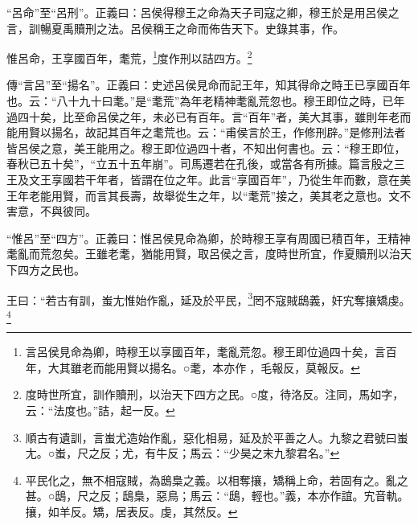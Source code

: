 {\noindent\shu{}\fzkt “呂命”至“呂刑”。正義曰：呂侯得穆王之命為天子司寇之卿，穆王於是用呂侯之言，訓暢夏禹贖刑之法。呂侯稱王之命而佈告天下。史錄其事，作。 \par}

惟呂命，王享國百年，耄荒，\footnote{言呂侯見命為卿，時穆王以享國百年，耄亂荒忽。穆王即位過四十矣，言百年，大其雖老而能用賢以揚名。○耄，本亦作𦿗，毛報反，莫報反。}度作刑以詰四方。\footnote{度時世所宜，訓作贖刑，以治天下四方之民。○度，待洛反。注同，馬如字，云：“法度也。”詰，起一反。}


{\noindent\zhuan{}\fzbyks 傳“言呂”至“揚名”。正義曰：史述呂侯見命而記王年，知其得命之時王已享國百年也。云：“八十九十曰耄。”是“耄荒”為年老精神耄亂荒忽也。穆王即位之時，已年過四十矣，比至命呂侯之年，未必已有百年。言“百年”者，美大其事，雖則年老而能用賢以揚名，故記其百年之耄荒也。云：“甫侯言於王，作修刑辟。”是修刑法者皆呂侯之意，美王能用之。穆王即位過四十者，不知出何書也。云：“穆王即位，春秋已五十矣”，“立五十五年崩”。司馬遷若在孔後，或當各有所據。篇言殷之三王及文王享國若干年者，皆謂在位之年。此言“享國百年”，乃從生年而數，意在美王年老能用賢，而言其長壽，故舉從生之年，以“耄荒”接之，美其老之意也。文不害意，不與彼同。 \par}

{\noindent\shu{}\fzkt “惟呂”至“四方”。正義曰：惟呂侯見命為卿，於時穆王享有周國已積百年，王精神耄亂而荒忽矣。王雖老耄，猶能用賢，取呂侯之言，度時世所宜，作夏贖刑以治天下四方之民也。 \par}

王曰：“若古有訓，蚩尢惟始作亂，延及於平民，\footnote{順古有遺訓，言蚩尤造始作亂，惡化相易，延及於平善之人。九黎之君號曰蚩尢。○蚩，尺之反；尤，有牛反；馬云：“少昊之末九黎君名。”}罔不寇賊鴟義，奸宄奪攘矯虔。\footnote{平民化之，無不相寇賊，為鴟梟之義。以相奪攘，矯稱上命，若固有之。亂之甚。○鴟，尺之反；鴟梟，惡鳥；馬云：“鴟，輕也。”義，本亦作誼。宄音軌。攘，如羊反。矯，居表反。虔，其然反。}


